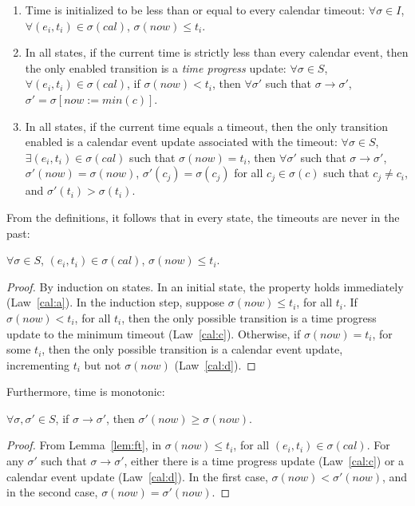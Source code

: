 \documentclass{llncs/llncs}
\begin{document}
\begin{enumerate}
\item \label{cal:a} Time is initialized to be less than or equal to every calendar timeout: $\forall \sigma \in I$, $\forall (e_i, t_i) \in \sigma(cal)$, $\sigma(now) \leq t_i$.


\item \label{cal:c} In all states, if the current time is strictly less than every calendar event, then the only enabled transition is a \emph{time progress} update: $\forall \sigma \in S$, $\forall (e_i, t_i) \in \sigma(cal)$, if $\sigma(now) < t_i$, then $\forall \sigma'$ such that $\sigma \rightarrow \sigma'$, $\sigma' = \sigma[now := min(c)]$.

\item \label{cal:d} In all states, if the current time equals a timeout, then the only transition enabled is a calendar event update associated with the timeout: $\forall \sigma \in S$, $\exists (e_i, t_i) \in \sigma(cal)$ such that $\sigma(now) = t_i$, then $\forall \sigma'$ such that $\sigma \rightarrow \sigma'$, $\sigma'(now) = \sigma(now)$, $\sigma'(c_j) = \sigma(c_j)$ for all $c_j \in \sigma(c)$ such that $c_j \neq c_i$, and $\sigma'(t_i) > \sigma(t_i)$.
\end{enumerate}

From the definitions, it follows that in every state, the timeouts are never in the past:
\begin{lemma}\label{lem:ft}
$\forall \sigma \in S$, $(e_i, t_i) \in \sigma(cal)$, $\sigma(now) \leq t_i$.
\end{lemma}
\begin{proof}
By induction on states. In an initial state, the property holds immediately (Law~\ref{cal:a}). In the induction step, suppose $\sigma(now) \leq t_i$, for all $t_i$. If $\sigma(now) < t_i$, for all $t_i$, then the only possible transition is a time progress update to the minimum timeout (Law~\ref{cal:c}). Otherwise, if $\sigma(now) = t_i$, for some $t_i$, then the only possible transition is a calendar event update, incrementing $t_i$ but not $\sigma(now)$ (Law~\ref{cal:d}).
\end{proof}

\noindent
Furthermore, time is monotonic:
\begin{lemma}
$\forall \sigma, \sigma' \in S$, if $\sigma \rightarrow \sigma'$, then $\sigma'(now) \geq \sigma(now)$.
\end{lemma}
\begin{proof}
From Lemma~\ref{lem:ft}, in $\sigma(now) \leq t_i$, for all $(e_i, t_i) \in \sigma(cal)$. For any $\sigma'$ such that $\sigma \rightarrow \sigma'$, either there is a time progress update (Law~\ref{cal:c}) or a calendar event update (Law~\ref{cal:d}). In the first case, $\sigma(now) < \sigma'(now)$, and in the second case, $\sigma(now) = \sigma'(now)$.
\end{proof}
\end{document}
